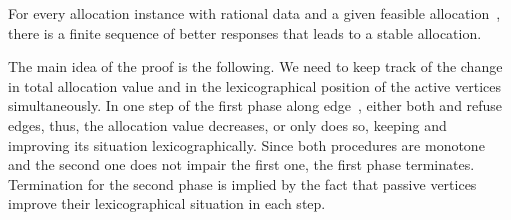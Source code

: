 \documentclass{llncs}
\begin{document}
\begin{theorem}
\label{th:better_rat}
For every allocation instance with rational data and a given feasible allocation~, there is a finite sequence of better responses that leads to a stable allocation.
\end{theorem}

The main idea of the proof is the following. We need to keep track of the change in total allocation value and in the lexicographical position of the active vertices simultaneously. In one step of the first phase along edge~, either both  and  refuse edges, thus, the allocation value  decreases, or only  does so, keeping  and improving its situation lexicographically. Since both procedures are monotone and the second one does not impair the first one, the first phase terminates. Termination for the second phase is implied by the fact that passive vertices improve their lexicographical situation in each step. 
\end{document}
